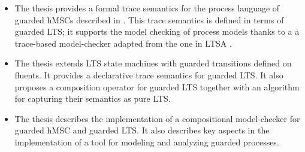 \begin{itemize}
\item The thesis provides a formal trace semantics for the process language of guarded hMSCs described in \cite{Damas:2011}. This trace semantics is defined in terms of guarded LTS; it supports the model checking of process models thanks to a a trace-based model-checker adapted from the one in LTSA \cite{Magee:1999}. 
\item The thesis extends LTS state machines with guarded transitions defined on fluents. It provides a declarative trace semantics for guarded LTS. It also proposes a composition operator for guarded LTS together with an algorithm for capturing their semantics as pure LTS.
\item The thesis describes the implementation of a compositional model-checker for guarded hMSC and guarded LTS. It also describes key aspects in the implementation of a tool for modeling and analyzing guarded processes. 
\end{itemize}
